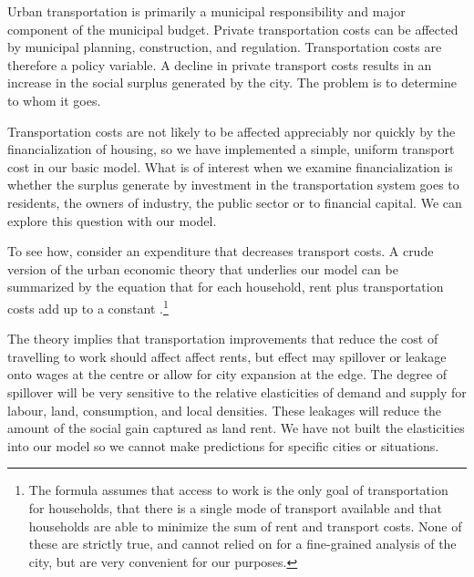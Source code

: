 Urban transportation is primarily a municipal responsibility and major component of the municipal budget. Private transportation costs can be affected by municipal planning, construction, and regulation. Transportation costs are therefore a policy variable.  A decline in private transport costs results in an increase in the social surplus generated by the city. The problem is to determine to whom it goes. 

Transportation costs are not likely to be affected appreciably nor quickly by the financialization of housing,
so we have implemented a simple, uniform transport cost in our basic model. What is of interest when we examine financialization is whether the surplus generate by investment in the transportation system goes to residents, the owners of industry, the public sector or to financial capital. We can explore this question with our model. 

To see how, consider an expenditure that decreases transport costs.  A crude version of the urban economic theory  that underlies our  model can be summarized by the equation that for each household, rent plus transportation costs add up to a constant \cite{sootTransportationCostsUrban1974c}.\footnote{The formula assumes that access to work is the only goal of transportation for households, that there is a single mode of transport available and that households are able to minimize the sum of rent and transport costs. None of these are strictly true, and cannot relied on for a fine-grained analysis of the city, but are very convenient for our purposes.} %

The theory implies that transportation improvements that reduce the cost of travelling to work should  affect affect rents, but effect may spillover or leakage  onto wages  at the centre or allow for city expansion at the edge.   The degree of spillover will be very sensitive to the relative elasticities of demand and supply  for labour, land, consumption, and local densities. These leakages will reduce the amount of the social gain captured as land rent. We  have not built the elasticities into our model so we cannot make predictions for specific cities or situations. %

